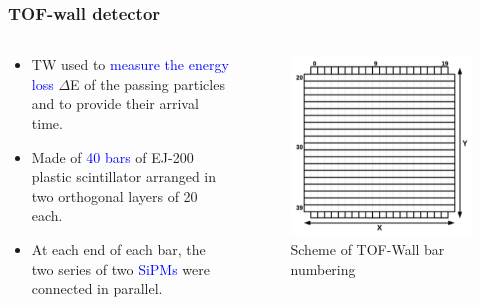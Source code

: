 \begin{frame} [fragile]
	\frametitle{TOF-wall detector}
	\begin{columns}
  		\begin{column}{0.50\textwidth}
            \begin{itemize}
                \item TW used to \textcolor{blue}{measure the energy loss} $\Delta$E of the passing particles and to provide their arrival time.
                \item Made of \textcolor{blue}{40 bars} of EJ-200 plastic scintillator arranged in two orthogonal layers of 20 each.
                \item At each end of each bar, the two series of two \textcolor{blue}{SiPMs} were connected in parallel.
            \end{itemize}
		\end{column}
    \begin{column}{0.50\textwidth}
 		\newline
			\begin{figure}
	  		    \centering
				\includegraphics[scale=0.15]{figures/tof_wall_scheme.png}
                \caption{Scheme of TOF-Wall bar numbering}
			\end{figure}
    \end{column}
\end{columns}
\end{frame}